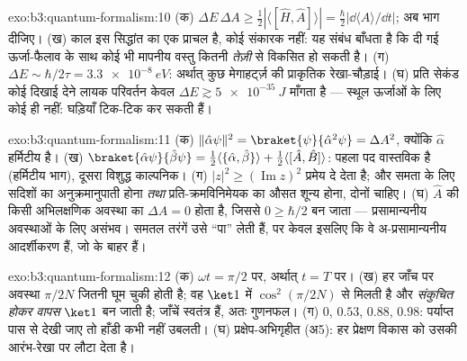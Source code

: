 \begin{solution}{exo:b3:quantum-formalism:10}
(क) $\Delta E\,\Delta A \ge \tfrac12|\langle[\hat H, \hat
A]\rangle| = \tfrac\hbar2|\dd\langle A\rangle/\dd t|$; अब भाग दीजिए। (ख)
काल इस सिद्धांत का एक प्राचल है, कोई संकारक नहीं: यह संबंध बाँधता है कि
दी गई ऊर्जा-फैलाव के साथ कोई भी मापनीय वस्तु कितनी \emph{तेज़ी} से
विकसित हो सकती है। (ग) $\Delta E \sim \hbar/2\tau = \qty{3.3e-8}{eV}$:
अर्थात् कुछ मेगाहर्ट्ज़ की प्राकृतिक रेखा-चौड़ाई। (घ) प्रति सेकंड कोई
दिखाई देने लायक परिवर्तन केवल $\Delta E \gtrsim \qty{5e-35}{J}$ माँगता
है --- स्थूल ऊर्जाओं के लिए कोई  ही नहीं: घड़ियाँ टिक-टिक कर सकती हैं।
\end{solution}

\begin{solution}{exo:b3:quantum-formalism:11}
(क) $\|\hat\alpha\psi\|^2 = \braket{\psi}{\hat\alpha^2\psi} =
\Delta A^2$, क्योंकि $\hat\alpha$ हर्मिटीय है। (ख) $\braket{\hat\alpha
\psi}{\hat\beta\psi} = \tfrac12\langle\{\hat\alpha,
\hat\beta\}\rangle + \tfrac12\langle[\hat A, \hat B]\rangle$: पहला
पद वास्तविक है (हर्मिटीय भाग), दूसरा विशुद्ध काल्पनिक।
(ग) $|z|^2 \ge (\operatorname{Im}z)^2$ प्रमेय दे देता है; और समता के
लिए सदिशों का अनुक्रमानुपाती होना \emph{तथा} प्रति-क्रमविनिमेयक का औसत
शून्य होना, दोनों चाहिए। (घ) $\hat A$ की किसी अभिलक्षणिक अवस्था का
$\Delta A = 0$ होता है, जिससे
$0 \ge \hbar/2$ बन जाता --- प्रसामान्यनीय अवस्थाओं के लिए असंभव। समतल
तरंगें उसे ``पा'' लेती हैं, पर केवल इसलिए कि वे अ-प्रसामान्यनीय
आदर्शीकरण हैं, जो  के बाहर हैं।
\end{solution}

\begin{solution}{exo:b3:quantum-formalism:12}
(क) $\omega t = \pi/2$ पर, अर्थात् $t = T$ पर। (ख) हर जाँच पर
अवस्था $\pi/2N$ जितनी घूम चुकी होती है; वह $\ket1$ में
$\cos^2(\pi/2N)$ से मिलती है और \emph{संकुचित होकर वापस} $\ket1$ बन
जाती है; जाँचें स्वतंत्र हैं, अतः गुणनफल। (ग) $0$, $0.53$, $0.88$, $0.98$:
पर्याप्त पास से देखी जाए तो हाँडी कभी नहीं उबलती। (घ) प्रक्षेप-अभिगृहीत
(अ5): हर प्रेक्षण विकास को उसकी आरंभ-रेखा पर लौटा देता है।
\end{solution}

